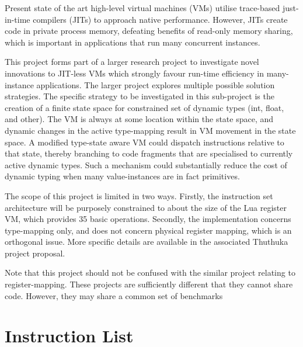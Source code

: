 \documentclass[english,a4paper,12pt]{report}
\begin{document}
Present state of the art high-level virtual machines (VMs) utilise
trace-based just-in-time compilers (JITs) to approach native
performance. However, JITs create code in private process memory,
defeating benefits of read-only memory sharing, which is important in
applications that run many concurrent instances. 

This project forms part of a larger research project to investigate
novel innovations to JIT-less VMs which strongly favour run-time
efficiency in many-instance applications. The larger project explores
multiple possible solution strategies. The specific strategy to be
investigated in this sub-project is the creation of a finite state
space for constrained set of dynamic types (int, float, and
other). The VM is always at some location within the state space, and
dynamic changes in the active type-mapping result in VM movement in
the state space. A modified type-state aware VM could dispatch
instructions relative to that state, thereby branching to code
fragments that are specialised to currently active dynamic types. Such
a mechanism could substantially reduce the cost of dynamic typing when
many value-instances are in fact primitives. 

The scope of this project is limited in two ways. Firstly, the
instruction set architecture will be purposely constrained to about
the size of the Lua register VM, which provides 35 basic
operations. Secondly, the implementation concerns type-mapping only,
and does not concern physical register mapping, which is an orthogonal
issue. More specific details are available in the associated Thuthuka
project proposal.

Note that this project should not be confused with the similar project
relating to register-mapping. These projects are sufficiently
different that they cannot share code. However, they may share a
common set of benchmarks

\chapter{Instruction List} 
\label{appendix-b}
\end{document}
